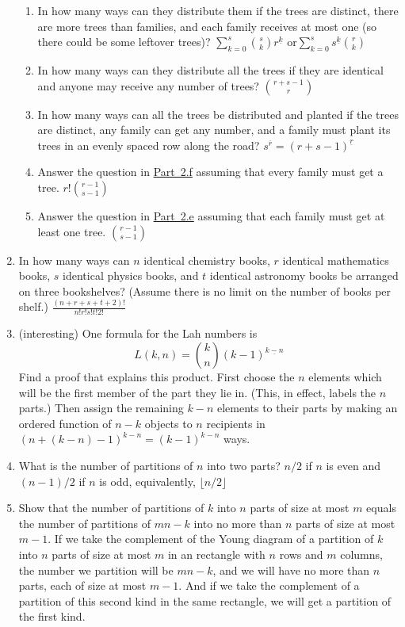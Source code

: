 \documentclass[10pt,]{book}
\theoremstyle{plain}
\theoremstyle{definition}
\numberwithin{equation}{chapter}
\begin{document}
\begin{enumerate}
\begin{enumerate}
%
\item\hypertarget{li-60}{}In how many ways can they distribute them if the trees are distinct, there are more trees than families, and each family receives at most one (so there could be some leftover trees)? \(\sum_{k=0}^s \binom{s}{k}r^{\underline{k}}\) or\(\sum_{k=0}^s s^{\underline{k}}\binom{r}{k}\)%
%
\item\hypertarget{multisetproblem}{}In how many ways can they distribute all the trees if they are identical and anyone may receive any number of trees? \(\binom{r+s-1}{r}\)%
%
\item\hypertarget{orderedfunctionproblem}{}In how many ways can all the trees be distributed and planted if the trees are distinct, any family can get any number, and a family must plant its trees in an evenly spaced row along the road? \(s^{\overline{r}}=(r+s-1)^{\underline{r}}\)%
%
\item\hypertarget{li-63}{}Answer the question in \hyperlink{orderedfunctionproblem}{Part~2.f} assuming that every family must get a tree. \(r!\binom{r-1}{s-1}\)%
%
\item\hypertarget{li-64}{}Answer the question in \hyperlink{multisetproblem}{Part~2.e} assuming that each family must get at least one tree. \(\binom{r-1}{s-1}\)%
%
\end{enumerate}
%
\item\hypertarget{li-65}{}In how many ways can \(n\) identical chemistry books, \(r\) identical mathematics books, \(s\) identical physics books, and \(t\) identical astronomy books be arranged on three bookshelves? (Assume there is no limit on the number of books per shelf.) \(\frac{(n+r+s+t+2)!}{n!r!s!t!2!}\)%
%
\item\hypertarget{li-66}{}(interesting) One formula for the Lah numbers is%
\begin{equation*}
L(k,n) = \binom{k}{n}(k-1)^{\underline{k-n}}
\end{equation*}
Find a proof that explains this product. First choose the \(n\) elements which will be the first member of the part they lie in. (This, in effect, labels the \(n\) parts.) Then assign the remaining \(k-n\) elements to their parts by making an ordered function of \(n-k\) objects to \(n\) recipients in \((n + (k-n) - 1)^{{k-n}} = (k-1)^{{k-n}}\) ways.%
%
\item\hypertarget{li-67}{}What is the number of partitions of \(n\) into two parts? \(n/2\) if \(n\) is even and \((n-1)/2\) if \(n\) is odd, equivalently, \(\lfloor n/2\rfloor\)%
%
\item\hypertarget{li-68}{}Show that the number of partitions of \(k\) into \(n\) parts of size at most \(m\) equals the number of partitions of \(mn-k\) into no more than \(n\) parts of size at most \(m-1\). If we take the complement of the Young diagram of a partition of \(k\) into \(n\) parts of size at most \(m\) in an rectangle with \(n\) rows and \(m\) columns, the number we partition will be \(mn-k\), and we will have no more than \(n\) parts, each of size at most \(m-1\). And if we take the complement of a partition of this second kind in the same rectangle, we will get a partition of the first kind.%

\end{enumerate}
\end{document}
